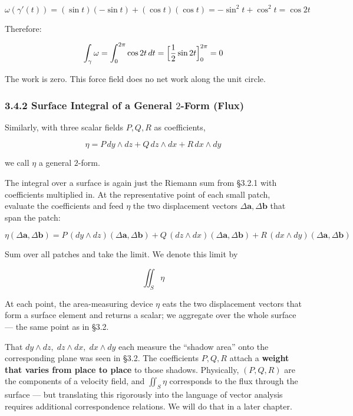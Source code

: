 \[\omega(\gamma'(t)) = (\sin t)(-\sin t) + (\cos t)(\cos t) = -\sin^2\!t + \cos^2\!t = \cos 2t\]

Therefore:

\[\int_\gamma \omega = \int_0^{2\pi} \cos 2t\,dt = \Bigl[\frac{1}{2}\sin 2t\Bigr]_0^{2\pi} = 0\]

The work is zero. This force field does no net work along the unit
circle.

\hypertarget{surface-integral-of-a-general-2-form-flux}{%
\subsubsection{\texorpdfstring{3.4.2 Surface Integral of a General
\(2\)-Form
(Flux)}{3.4.2 Surface Integral of a General 2-Form (Flux)}}\label{surface-integral-of-a-general-2-form-flux}}

Similarly, with three scalar fields \(P,Q,R\) as coefficients,

\[
\eta = P\,dy \wedge dz + Q\,dz \wedge dx + R\,dx \wedge dy
\]

we call \(\eta\) a general \(2\)-form.

The integral over a surface is again just the Riemann sum from §3.2.1
with coefficients multiplied in. At the representative point of each
small patch, evaluate the coefficients and feed \(\eta\) the two
displacement vectors \(\Delta\mathbf{a},\Delta\mathbf{b}\) that span the
patch:

\[\eta(\Delta\mathbf{a},\Delta\mathbf{b})
= P\,(dy \wedge dz)(\Delta\mathbf{a},\Delta\mathbf{b})
{}+ Q\,(dz \wedge dx)(\Delta\mathbf{a},\Delta\mathbf{b})
{}+ R\,(dx \wedge dy)(\Delta\mathbf{a},\Delta\mathbf{b})\]

Sum over all patches and take the limit. We denote this limit by

\[\iint_S \eta\]

At each point, the area-measuring device \(\eta\) eats the two
displacement vectors that form a surface element and returns a scalar;
we aggregate over the whole surface --- the same point as in §3.2.

That \(dy \wedge dz,\; dz \wedge dx,\; dx \wedge dy\) each measure the
``shadow area'' onto the corresponding plane was seen in §3.2. The
coefficients \(P, Q, R\) attach a
\textbf{weight that varies from place to place} to those shadows.
Physically, \((P, Q, R)\) are the components of a velocity field, and
\(\iint_S \eta\) corresponds to the flux through the surface --- but
translating this rigorously into the language of vector analysis
requires additional correspondence relations. We will do that in a later
chapter.

